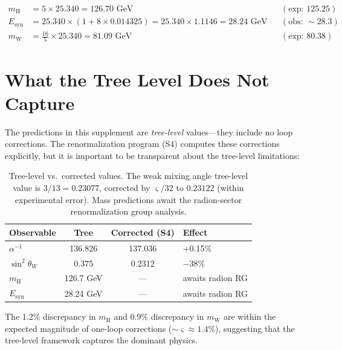 \documentclass[11pt,a4paper]{article}
\theoremstyle{definition}
\theoremstyle{remark}
\newcommand{\gs}{\varsigma}
\newcommand{\strain}{\varsigma}
\newcommand{\Esyn}{E_{\mathrm{syn}}}
\newcommand{\mH}{m_\mathrm{H}}
\newcommand{\mW}{m_\mathrm{W}}
\begin{document}
\begin{align}
\mH &= 5 \times 25.340 = 126.70 \text{ GeV} &&(\text{exp: } 125.25) \\[4pt]
\Esyn &= 25.340 \times (1 + 8 \times 0.014325) = 25.340 \times 1.1146 = 28.24 \text{ GeV} &&(\text{obs: } \sim\!28.3) \\[4pt]
\mW &= \frac{16}{5} \times 25.340 = 81.09 \text{ GeV} &&(\text{exp: } 80.38)
\end{align}

\section{What the Tree Level Does Not Capture}
\label{sec:limitations}

The predictions in this supplement are \emph{tree-level} values---they include no loop corrections. The renormalization program (S4) computes these corrections explicitly, but it is important to be transparent about the tree-level limitations:

\begin{table}[H]
\centering
\begin{tabular}{lccl}
\toprule
\textbf{Observable} & \textbf{Tree} & \textbf{Corrected (S4)} & \textbf{Effect} \\
\midrule
$\alpha^{-1}$ & 136.826 & 137.036 & +0.15\% \\
$\sin^2\theta_W$ & 0.375 & 0.2312 & $-38$\% \\
$\mH$ & 126.7 GeV & --- & awaits radion RG \\
$\Esyn$ & 28.24 GeV & --- & awaits radion RG \\
\bottomrule
\end{tabular}
\caption{Tree-level vs.\ corrected values. The weak mixing angle tree-level value is $3/13 = 0.23077$, corrected by $\strain/32$ to $0.23122$ (within experimental error). Mass predictions await the radion-sector renormalization group analysis.}
\label{tab:tree_vs_corrected}
\end{table}

The 1.2\% discrepancy in $\mH$ and 0.9\% discrepancy in $\mW$ are within the expected magnitude of one-loop corrections ($\sim \gs \approx 1.4$\%), suggesting that the tree-level framework captures the dominant physics.

\end{document}
